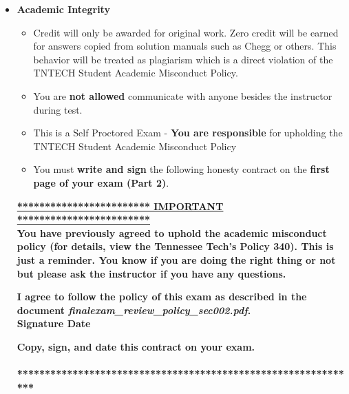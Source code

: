 \documentclass[11pt]{article}
\begin{document}
\begin{itemize}
\begin{itemize}
	\end{itemize}

\newpage
		\item  \textbf{ \Large Academic Integrity}
\begin{itemize}

		\item {\B Credit will only be awarded for original work. Zero credit will be earned for answers copied from solution manuals such as Chegg or others. This behavior will be treated as plagiarism which is a direct violation of the TNTECH Student Academic Misconduct Policy.}

		\item  You are {\bf not allowed} communicate with anyone besides the instructor during test. 
		\item This is a Self Proctored Exam - {\bf You are responsible} for upholding the TNTECH Student Academic Misconduct Policy
		\item  You must {\bf write and sign} the following honesty contract on the {\bf first page of your exam (Part 2)}. 
		
		

\end{itemize}


 {\R  \bf \underline{************************ IMPORTANT ************************}} \vspace{3mm}\\
			  {\R \bf You have previously agreed to uphold the academic misconduct policy (for details, view the
Tennessee Tech’s Policy 340). This is just a reminder. You know if you are doing the right thing or not but please ask the instructor if you have any questions. }
\begin{framed}
	
	\vspace{3mm}	 \textbf{ I \underline{\hspace{50mm}} agree to follow the policy of this exam \vspc as described in the document {\it finalexam\_review\_policy\_sec002.pdf}.  }\vspace{3mm}\\
		 \textbf{\Large Signature \underline{\hspace{80mm}} Date\underline{\hspace{20mm} }}\\

\end{framed}
			{\R  \bf Copy, sign, and date this contract on your exam. }   \vspace{1mm}\\
			{\R  \bf \underline{\hspace{140mm}}} \\
			{\R  \bf ***************************************************************} 


\end{itemize}
\end{document}
